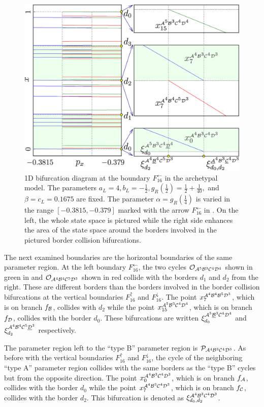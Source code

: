\begin{figure}
	\centering
	\includegraphics[width=.7 \textwidth]{../Figures/6/6.6/result.png}
	\caption[1D bifurcation diagram at the boundary $F_{16}^\leftarrow$ in the archetypal model]{
		1D bifurcation diagram at the boundary $F_{16}^\leftarrow$ in the archetypal model.
		The parameters $a_L = 4, b_L = -\frac{1}{2}, g_R\left(\frac{1}{2}\right) = \frac{1}{2} + \frac{1}{40},$ and $\beta = c_L = 0.1675$ are fixed.
		The parameter $\alpha = g_R\left(\frac{1}{4}\right)$ is varied in the range $[-0.3815, -0.379]$ marked with the arrow $F_{16}^\leftarrow$ in .
		On the left, the whole state space is pictured while the right side enhances the area of the state space around the borders involved in the pictured border collision bifurcations.
	}
	\label{fig:arch.bif.F.left}
\end{figure}

The next examined boundaries are the horizontal boundaries of the same parameter region.
At the left boundary $F_{16}^\leftarrow$, the two cycles $\mathcal{O}_{\mathcal{A}^5\mathcal{B}^3\mathcal{C}^4\mathcal{D}^4}$ shown in green in  and $\mathcal{O}_{\mathcal{A}^4\mathcal{B}^4\mathcal{C}^5\mathcal{D}^3}$ shown in red collide with the borders $d_1$ and $d_2$ from the right.
These are different borders than the borders involved in the border collision bifurcations at the vertical boundaries $F_{16}^\uparrow$ and $F_{16}^\downarrow$.
The point $x_{7}^{\mathcal{A}^4\mathcal{B}^4\mathcal{B}^5\mathcal{D}^3}$, which is on branch $f_{\mathcal{B}}$, collides with $d_2$ while the point $x_{15}^{\mathcal{A}^5\mathcal{B}^3\mathcal{C}^4\mathcal{D}^4}$, which is on branch $f_{\mathcal{D}}$, collides with the border $d_0$.
These bifurcations are written $\xi_{d_0}^{\mathcal{A}^5\underline{\mathcal{B}}^3\mathcal{C}^4\mathcal{D}^4}$ and $\xi_{d_2}^{\mathcal{A}^4\mathcal{B}^4\mathcal{C}^5\underline{\mathcal{D}}^3}$ respectively.

The parameter region left to the ``type B'' parameter region is $\mathcal{P}_{\mathcal{A}^4\mathcal{B}^3\mathcal{C}^4\mathcal{D}^3}$.
As before with the vertical boundaries $F_{16}^\uparrow$ and $F_{16}^\downarrow$, the cycle of the neighboring ``type A'' parameter region collides with the same borders as the ``type B'' cycles but from the opposite direction.
The point $x_{0}^{\mathcal{A}^4\mathcal{B}^3\mathcal{C}^4\mathcal{D}^3}$, which is on branch $f_{\mathcal{A}}$, collides with the border $d_0$ while the point $x_{7}^{\mathcal{A}^4\mathcal{B}^3\mathcal{C}^4\mathcal{D}^3}$, which is on branch $f_{\mathcal{C}}$, collides with the border $d_2$.
This bifurcation is denoted as $\xi_{d_0, d_2}^{\mathcal{A}^4\mathcal{B}^3\mathcal{C}^4\mathcal{D}^3}$.

